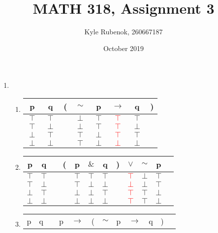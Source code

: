 \documentclass{article}
\title{MATH 318, Assignment 3}
\author{Kyle Rubenok, 260667187}
\date{October 2019}
\begin{document}
\maketitle

\begin{enumerate}
    \item 
    \begin{enumerate}
        \item
            \begin{tabular}{ c  c | c  c  c  c  c  c }
            p & q & ( & $\sim$ & p & $\rightarrow$ & q & )\\
            \hline 
            $\top$ & $\top$ &  & $\perp$ & $\top$ & \textcolor{red}{$\top$} & $\top$ & \\
            $\top$ & $\perp$ &  & $\perp$ & $\top$ & \textcolor{red}{$\top$} & $\perp$ & \\
            $\perp$ & $\top$ &  & $\top$ & $\perp$ & \textcolor{red}{$\top$} & $\top$ & \\
            $\perp$ & $\perp$ &  & $\top$ & $\perp$ & \textcolor{red}{$\perp$} & $\perp$ & \\
            \end{tabular}
        \item
            \begin{tabular}{@{ }c@{ }@{ }c | c@{ }@{}c@{}@{ }c@{ }@{ }c@{ }@{ }c@{ }@{}c@{}@{ }c@{ }@{ }c@{ }@{ }c@{ }@{ }c} p & q &  & ( & p & $\&$ & q & ) & $\lor$ & $\sim$ & p & \\
            \hline 
            $\top$ & $\top$ &  &  & $\top$ & $\top$ & $\top$ &  & \textcolor{red}{$\top$} & $\bot$ & $\top$ & \\
            $\top$ & $\bot$ &  &  & $\top$ & $\bot$ & $\bot$ &  & \textcolor{red}{$\bot$} & $\bot$ & $\top$ & \\
            $\bot$ & $\top$ &  &  & $\bot$ & $\bot$ & $\top$ &  & \textcolor{red}{$\top$} & $\top$ & $\bot$ & \\
            $\bot$ & $\bot$ &  &  & $\bot$ & $\bot$ & $\bot$ &  & \textcolor{red}{$\top$} & $\top$ & $\bot$ & \\
            \end{tabular}
        \item
            \begin{tabular}{@{ }c@{ }@{ }c | c@{ }@{ }c@{ }@{ }c@{ }@{}c@{}@{ }c@{ }@{ }c@{ }@{ }c@{ }@{ }c@{ }@{}c@{}@{ }c}
            p & q &  & p & $\rightarrow$ & ( & $\sim$ & p & $\rightarrow$ & q & ) & \\

\end{tabular}
\end{enumerate}
\end{enumerate}
\end{document}
